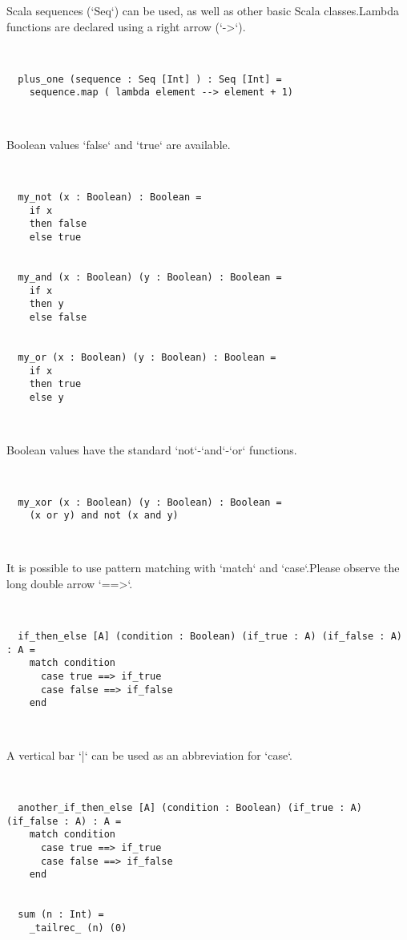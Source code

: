 Scala sequences (`Seq`) can be used, as well as other basic Scala classes.Lambda functions are declared using a right arrow (`->`). 


\begin{lstlisting}


  plus_one (sequence : Seq [Int] ) : Seq [Int] =
    sequence.map ( lambda element --> element + 1)



\end{lstlisting}

Boolean values `false` and `true` are available. 


\begin{lstlisting}


  my_not (x : Boolean) : Boolean =
    if x
    then false
    else true


  my_and (x : Boolean) (y : Boolean) : Boolean =
    if x
    then y
    else false


  my_or (x : Boolean) (y : Boolean) : Boolean =
    if x
    then true
    else y



\end{lstlisting}

Boolean values have the standard `not`-`and`-`or` functions. 


\begin{lstlisting}


  my_xor (x : Boolean) (y : Boolean) : Boolean =
    (x or y) and not (x and y)



\end{lstlisting}

It is possible to use pattern matching with `match` and `case`.Please observe the long double arrow `==>`. 


\begin{lstlisting}


  if_then_else [A] (condition : Boolean) (if_true : A) (if_false : A) : A =
    match condition
      case true ==> if_true
      case false ==> if_false
    end



\end{lstlisting}

A vertical bar `|` can be used as an abbreviation for `case`. 


\begin{lstlisting}


  another_if_then_else [A] (condition : Boolean) (if_true : A) (if_false : A) : A =
    match condition
      case true ==> if_true
      case false ==> if_false
    end


  sum (n : Int) =
    _tailrec_ (n) (0)



\end{lstlisting}

